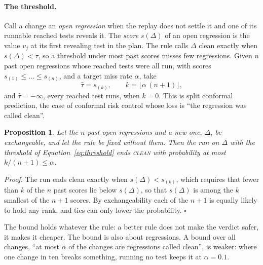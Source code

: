 \documentclass[11pt,a4paper]{article}
\newtheorem{proposition}{Proposition}
\newcommand{\clean}{\textsc{clean}}
\begin{document}
\paragraph{The threshold.} Call a change an \emph{open regression} when the replay does not settle it and one of
its runnable reached tests reveals it. The \emph{score} $s(\Delta)$ of an open regression is the value $v_j$ at
its first revealing test in the plan. The rule calls $\Delta$ clean exactly when $s(\Delta) < \tau$, so a
threshold under most past scores misses few regressions. Given $n$ past open regressions whose reached tests were
all run, with scores $s_{(1)} \le \dots \le s_{(n)}$, and a target miss rate $\alpha$, take
\begin{equation}
  \hat\tau = s_{(k)}, \qquad k = \lfloor \alpha\,(n + 1) \rfloor ,
  \label{eq:threshold}
\end{equation}
and $\hat\tau = -\infty$, every reached test runs, when $k = 0$. This is split conformal prediction, the case of
conformal risk control \cite{angelopoulos2024conformal} whose loss is ``the regression was called clean''.

\begin{proposition}
\label{prop:miss}
Let the $n$ past open regressions and a new one, $\Delta$, be exchangeable, and let the rule be fixed without
them. Then the run on $\Delta$ with the threshold of Equation~\ref{eq:threshold} ends \clean{} with probability at
most $k/(n+1) \le \alpha$.
\end{proposition}
\noindent\emph{Proof.} The run ends clean exactly when $s(\Delta) < s_{(k)}$, which requires that fewer than $k$
of the $n$ past scores lie below $s(\Delta)$, so that $s(\Delta)$ is among the $k$ smallest of the $n + 1$ scores.
By exchangeability each of the $n + 1$ is equally likely to hold any rank, and ties can only lower the
probability. \hfill$\square$

\medskip
The bound holds whatever the rule: a better rule does not make the verdict safer, it makes it cheaper. The bound
is also about regressions. A bound over all changes, ``at most $\alpha$ of the changes are regressions called
clean'', is weaker: where one change in ten breaks something, running no test keeps it at $\alpha = 0.1$.
\end{document}
